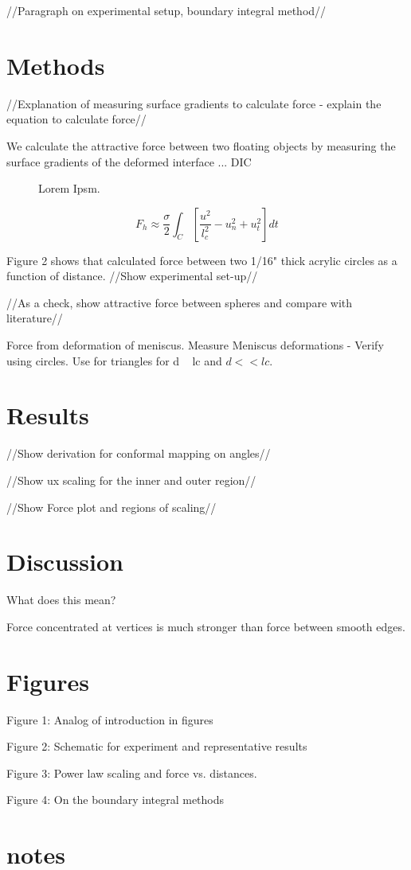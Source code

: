 \documentclass[twocolumn,prl]{revtex4-1}
\begin{document}
//Paragraph on experimental setup, boundary integral method//
	 

\section{Methods}
//Explanation of measuring surface gradients to calculate force - explain the equation to calculate force//

We calculate the attractive force between two floating objects by measuring the surface gradients of the deformed interface ... DIC

\begin{figure}[htb]

\caption{Lorem Ipsm.}
\label{fig:Fig2}
\end{figure}

\begin{equation}
F_h \approx \frac{\sigma}{2} \int _C [\frac{u^2}{l_c^2}- u_n^2 +u_t^2] dt
\end{equation}

Figure 2 shows that calculated force between two 1/16" thick acrylic circles as a function of distance.
//Show experimental set-up//

//As a check, show attractive force between spheres and compare with literature//

Force from deformation of meniscus. Measure Meniscus deformations - Verify using circles. Use for triangles for d ~ lc and $d << lc$.

\section{Results}
//Show derivation for conformal mapping on angles//

//Show ux scaling for the inner and outer region//

//Show Force plot and regions of scaling//

\section{Discussion}
What does this mean?

Force concentrated at vertices is much stronger than force between smooth edges.

\section{Figures}
Figure 1: Analog of introduction in figures

Figure 2: Schematic for experiment and representative results 

Figure 3: Power law scaling and force vs. distances.

Figure 4: On the boundary integral methods

\section{notes}




\end{document}
